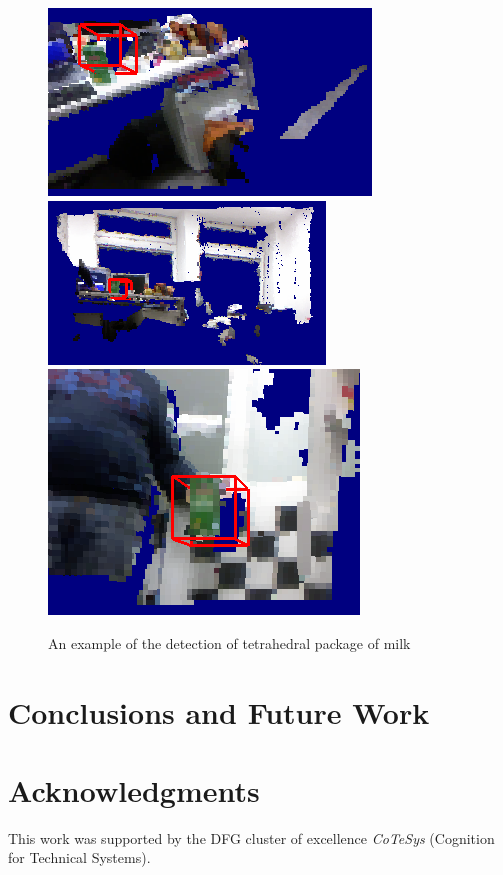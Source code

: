 \documentclass[conference]{sty/IEEEtran}
\begin{document}


\begin{figure}[htb!]
  \begin{center}
    \includegraphics[width=.45\columnwidth]{figures/colorCHLAC/detection7.png}
\hfill
    \includegraphics[width=.45\columnwidth]{figures/colorCHLAC/detection5.png} \\
\hfill
    \includegraphics[width=.9\columnwidth]{figures/colorCHLAC/detection2.png}
\caption{An example of the detection of tetrahedral package of milk}
    \label{fig:milk_testing}
  \end{center}
\end{figure}


\section{Conclusions and Future Work}
\label{sec:conclusion}

\section*{Acknowledgments}
This work was supported by the DFG cluster of excellence \emph{CoTeSys} (Cognition for Technical Systems).\\



\end{document}
